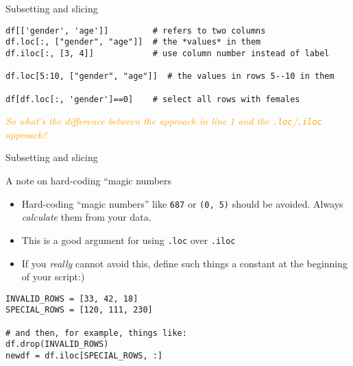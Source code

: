 \begin{frame}[fragile]{Subsetting and slicing}
\begin{verbatim}
df[['gender', 'age']]         # refers to two columns
df.loc[:, ["gender", "age"]]  # the *values* in them
df.iloc[:, [3, 4]]            # use column number instead of label

df.loc[5:10, ["gender", "age"]]  # the values in rows 5--10 in them

df[df.loc[:, 'gender']==0]    # select all rows with females
\end{verbatim}    
\pause

\emph{\textcolor{orange}{So what's the difference between the approach in line 1 and the \texttt{.loc}/\texttt{.iloc} approach?}}
\end{frame}


\iffalse
\begin{frame}{Subsetting and slicing}
  The difference is between creating a copy and referring to \emph{exactly} the same object itself:
\makebox[\linewidth]{
\texttt{[image: pandas-loc-vs-iloc.png]}}
\end{frame}




\question{Do you understand why there is two times \texttt{df} in this expression: \texttt{df[df.loc[:, 'gender']==0]}? Hint: What does the inner part (\texttt{df.loc[:,'gender']==0}) return?  (You may guess!)}
\fi



\begin{frame}[fragile]{Subsetting and slicing }
  \begin{block}{A note on hard-coding ``magic numbers}
    \begin{itemize}
    \item Hard-coding ``magic numbers'' like \texttt{687} or \texttt{(0, 5)} should be avoided. Always \emph{calculate} them from your data.
    \item This is a good argument for using \texttt{.loc} over \texttt{.iloc}
    \item If you \emph{really} cannot avoid this, define such things a constant at the beginning of your script:)      
    \end{itemize}
  \end{block}

\begin{verbatim}
INVALID_ROWS = [33, 42, 18]
SPECIAL_ROWS = [120, 111, 230]

# and then, for example, things like:
df.drop(INVALID_ROWS)
newdf = df.iloc[SPECIAL_ROWS, :]
\end{verbatim}
  
\end{frame}



